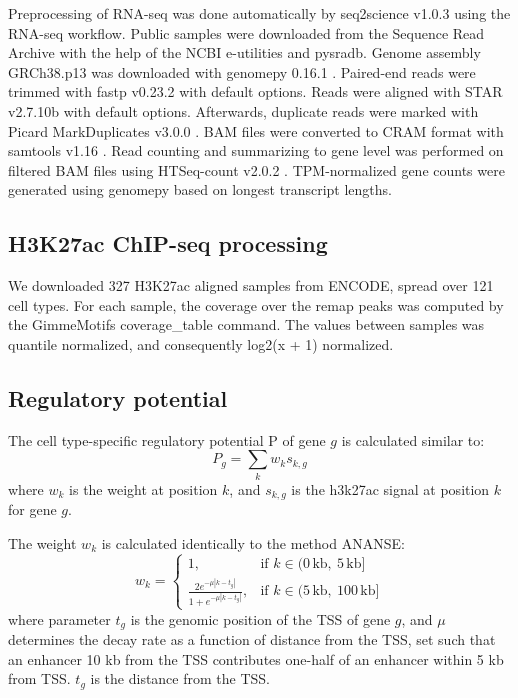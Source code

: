 Preprocessing of RNA-seq was done automatically by seq2science v1.0.3 \cite{seq2science} using the RNA-seq workflow. Public samples were downloaded from the Sequence Read Archive \cite{Leinonen2010} with the help of the NCBI e-utilities and pysradb\cite{Choudhary2019}. Genome assembly GRCh38.p13 was downloaded with genomepy 0.16.1 \cite{Frlich2023}. Paired-end reads were trimmed with fastp v0.23.2 \cite{Chen2018} with default options. Reads were aligned with STAR v2.7.10b \cite{Dobin2012} with default options. Afterwards, duplicate reads were marked with Picard MarkDuplicates v3.0.0 \cite{picard}. BAM files were converted to CRAM format with samtools v1.16 \cite{Danecek2021}. Read counting and summarizing to gene level was performed on filtered BAM files using HTSeq-count v2.0.2 \cite{Anders2014}. TPM-normalized gene counts were generated using genomepy based on longest transcript lengths.

\subsection{H3K27ac ChIP-seq processing}

We downloaded 327 H3K27ac aligned samples from ENCODE\cite{encode_dcc}, spread over 121 cell types. For each sample, the coverage over the remap peaks was computed by the GimmeMotifs coverage\_table command\cite{Bruse_2018}. The values between samples was quantile normalized\cite{qnorm}, and consequently log2(x + 1) normalized.

\subsection{Regulatory potential}\label{section:regpotential}

The cell type-specific regulatory potential P of gene $g$ is calculated similar to\cite{Wang2016}:
\begin{equation*}
    P_g = \sum_k w_{k}s_{k,g}
\end{equation*}
where $w_k$ is the weight at position $k$, and $s_{k,g}$ is the h3k27ac signal at position $k$ for gene $g$.

\noindent
The weight $w_k$ is calculated identically to the method ANANSE\cite{Xu_2020}:
\begin{equation*}
    w_k = \begin{cases}
        1, & \text{if } k \in (0\,\text{kb},\ 5\,\text{kb}] \\
        \frac{2e^{-\mu|k-t_g|}}{1+e^{-\mu|k-t_g|}}, & \text{if } k \in (5\,\text{kb},\ 100\,\text{kb}]
    \end{cases}
\end{equation*}
where parameter $t_g$ is the genomic position of the TSS of gene $g$, and $\mu$ determines the decay rate as a function of distance from the TSS, set such that an enhancer 10 kb from the TSS contributes one-half of an enhancer within 5 kb from TSS. $t_g$ is the distance from the TSS.

